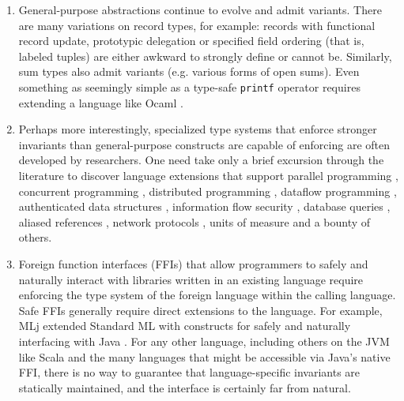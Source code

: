 \documentclass[9pt,preprint]{sigplanconf}
\begin{document}
\begin{enumerate}
\item General-purpose abstractions continue to evolve and admit variants. There are many  variations on record types, for example: records with functional record update, prototypic delegation or specified field ordering (that is, labeled tuples) are either awkward to strongly define or cannot be. Similarly, sum types also admit variants (e.g. various forms of open sums). Even something as seemingly simple as a type-safe \verb|printf| operator requires extending a language like Ocaml  \cite{ocaml-printf}.

\item Perhaps more interestingly, specialized type systems that enforce stronger invariants than general-purpose constructs are capable of enforcing are often developed by researchers. One need take only a brief  excursion through the literature to discover language extensions that support parallel programming \cite{a}, concurrent programming \cite{cml}, distributed programming \cite{tom7}, dataflow programming \cite{reactiveml}, authenticated data structures \cite{popl13}, information flow security \cite{walker00, smith2001}, database queries \cite{db}, aliased references \cite{naden12}, network protocols \cite{sekar99}, units of measure \cite{keneddy} and a bounty of others.%
\item Foreign function interfaces (FFIs) that allow programmers to safely and naturally interact with libraries written in an existing language require enforcing the type system of the foreign language within the calling language. %
Safe FFIs generally require direct extensions to the language. For example, MLj extended Standard ML with constructs for safely and naturally interfacing with Java \cite{mlj}. For any other language, including  others on the JVM like Scala and the many languages that might be accessible via Java's native FFI, there is no way to guarantee that language-specific invariants are statically maintained, and the interface is certainly far from natural.
\end{enumerate}
\end{document}
